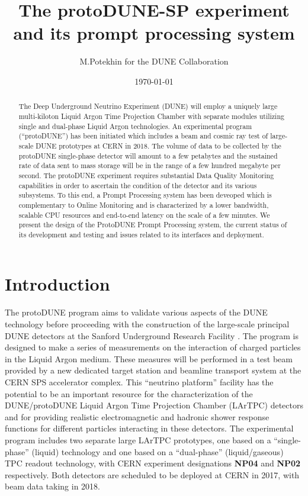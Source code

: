 \documentclass[pdftex,12pt,letter]{article}
\title{The protoDUNE-SP experiment and its prompt processing system}
\date{\today}
\author{M.Potekhin for the DUNE Collaboration}
\newcommand{\pd}{protoDUNE\xspace}
\begin{document}

\maketitle

\begin{abstract}


\noindent The Deep Underground Neutrino Experiment (DUNE) will employ a uniquely large multi-kiloton
Liquid Argon Time Projection Chamber with separate modules utilizing
single and dual-phase Liquid Argon technologies. An experimental 
program (``protoDUNE'')  has been initiated which includes a beam and cosmic ray test of large-scale DUNE prototypes at CERN in 2018.
The volume of data to be collected by the protoDUNE single-phase detector will amount to a few petabytes
and the sustained rate of data sent to mass storage will be in the range of a few hundred megabyte per second.
The protoDUNE experiment requires substantial Data Quality Monitoring capabilities in order to ascertain the
condition of the detector and its various subsystems. To this end, a Prompt Processing system has been deveoped
which is complementary to Online Monitoring and is characterized by a lower bandwidth, scalable CPU resources
and end-to-end latency on the scale of a few minutes. We present the design of the ProtoDUNE Prompt Processing
system, the current status of its development and testing and issues related to its interfaces and deployment.


\end{abstract}

\tableofcontents

\pagebreak

\section{Introduction}
The \pd program aims to validate various aspects of the DUNE technology  before proceeding with
the construction of the large-scale principal DUNE detectors at the Sanford Underground Research Facility \cite{cdrVol1, cdrVol4}.
The program is designed to make a series of measurements on the
interaction of charged particles in the Liquid Argon medium.  These
measures will be performed in a test beam provided by a new dedicated
target station and beamline transport system at the CERN SPS
accelerator complex.  This ``neutrino platform'' facility has the
potential to be an important resource for the characterization of the DUNE/protoDUNE
Liquid Argon Time Projection Chamber (LArTPC) detectors and for
providing realistic electromagnetic and hadronic shower response
functions for different particles interacting in these detectors. 
The experimental program includes two separate
large LArTPC prototypes, one based on a ``single-phase'' (liquid) technology and
one based on a ``dual-phase'' (liquid/gaseous) TPC readout technology,
with CERN experiment designations \textbf{NP04} and \textbf{NP02}
respectively.  Both detectors are scheduled to be deployed at CERN in
2017, with beam data taking in 2018.
\end{document}
